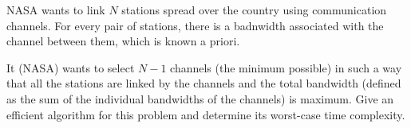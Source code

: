 NASA wants to link $N$ stations spread over the country using
communication channels.  For every pair of stations, there is a
badnwidth associated with the channel between them, which is known a
priori.

It (NASA) wants to select $N-1$ channels (the minimum possible) in
such a way that all the stations are linked by the channels and the
total bandwidth (defined as the sum of the individual bandwidths of
the channels) is maximum.  Give an efficient algorithm for this
problem and determine its worst-case time complexity.
